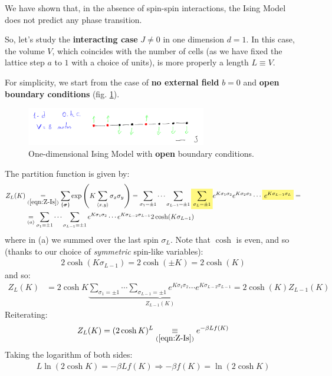 \documentclass[../template.tex]{subfiles}
\begin{document}
We have shown that, in the absence of spin-spin interactions, the Ising Model does not predict any phase transition.

\medskip

So, let's study the \textbf{interacting case} $J\neq 0$ in one dimension $d=1$. In this case, the volume $V$, which coincides with the number of cells (as we have fixed the lattice step $a$ to $1$ with a choice of units), is more properly a length $L \equiv V$.

\medskip

For simplicity, we start from the case of \textbf{no external field} $b=0$ and \textbf{open boundary conditions} (fig. \ref{fig:obcd1}).   

\begin{figure}[H]
    \centering
    \includegraphics[width=0.7\textwidth]{image016.png}
    \caption{One-dimensional Ising Model with \textbf{open} boundary conditions.\label{fig:obcd1}}
\end{figure}

The partition function is given by:
\begin{align*}
    Z_L(K) &\underset{(\ref{eqn:Z-Is})}{=} 
    \sum_{\{\bm{\sigma}\}}\exp\left( K \sum_{\langle x,y \rangle} \sigma_x \sigma_y \right) =
    \sum_{\sigma_1 = \pm 1} \cdots \sum_{\sigma_{L-1}=\pm 1} \hlc{Yellow}{\sum_{\sigma_L = \pm 1}} e^{K \sigma_1 \sigma_2} e^{K \sigma_2 \sigma_3} \cdots \hlc{Yellow}{e^{K \sigma_{L-1} \sigma_L}} =\\
    &\underset{(a)}{=}  \sum_{\sigma_1 = \pm 1} \cdots \sum_{\sigma_{L-1}=\pm 1} e^{K \sigma_1 \sigma_2} \cdots e^{K \sigma_{L-2} \sigma_{L-1}} 2 \cosh (K \sigma_{L-1})
\end{align*}
where in (a) we summed over the last spin $\sigma_L$. Note that $\cosh$ is even, and so (thanks to our choice of \textit{symmetric} spin-like variables):
\begin{align*}
   2\cosh(K \sigma_{L-1}) = 2 \cosh(\pm K)  = 2 \cosh(K)
\end{align*}
and so:
\begin{align*}
    Z_L(K) &= 2\cosh K  \underbrace{\sum_{\sigma_1 = \pm 1} \cdots \sum_{\sigma_{L-1}=\pm 1} e^{K \sigma_1 \sigma_2} \cdots e^{K \sigma_{L-2} \sigma_{L-1}} }_{Z_{L-1}(K)}  = 2\cosh (K) Z_{L-1}(K)
\end{align*}
Reiterating:
\begin{align*}
    Z_L(K) = (2\cosh K)^L \underset{(\ref{eqn:Z-Is})}{\equiv}  e^{- \beta L f(K)} 
\end{align*}
Taking the logarithm of both sides:
\begin{align*}
    L \ln (2 \cosh K) = -\beta L f(K) \Rightarrow -\beta f(K) = \ln(2\cosh K)
\end{align*}
\end{document}
